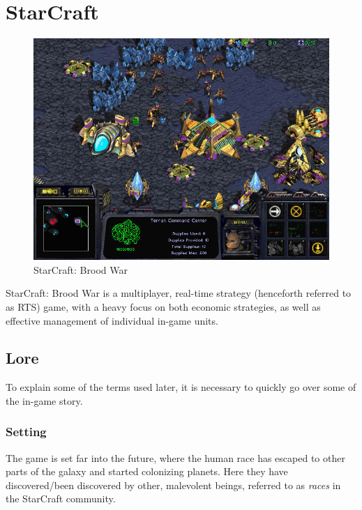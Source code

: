 
\section{StarCraft}
\label{sec:starcrafttheory}
\begin{figure}[h!tb]
\centering
\includegraphics[scale=0.5]{graphics/scbw.jpg}
\caption{StarCraft: Brood War}
\label{fig:scbwIntro}
\end{figure}


StarCraft: Brood War is a multiplayer, real-time strategy (henceforth referred to as RTS) game, with a heavy focus on both economic strategies, as well as effective management of individual in-game units.

\subsection{Lore}
To explain some of the terms used later, it is necessary to quickly go over some of the in-game story.

\subsubsection{Setting}
The game is set far into the future, where the human race has escaped to other parts of the galaxy and started colonizing planets. Here they have discovered/been discovered by other, malevolent beings, referred to as {\em races} in the StarCraft community.
